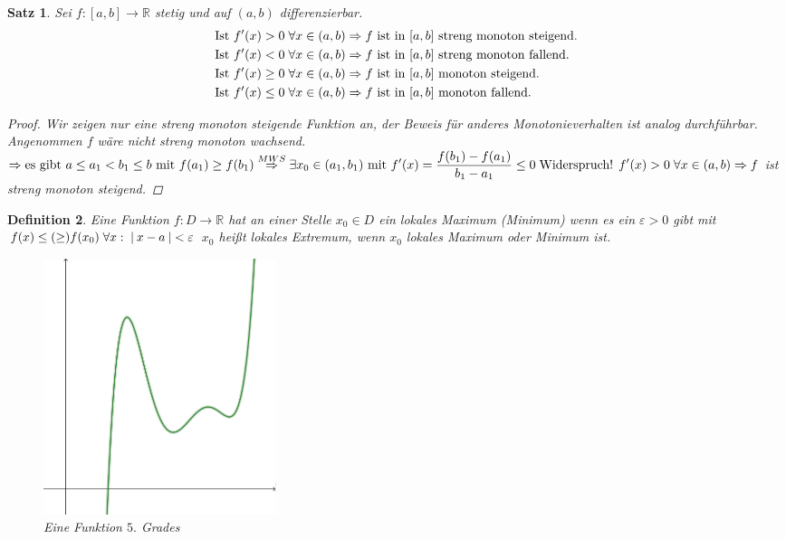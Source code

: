 \documentclass[a4paper,titlepage,oneside]{article}
\def\R{\ensuremath{\mathbb{R}} }
\renewcommand{\epsilon}{\ensuremath{\varepsilon} }
\def\WSP{\text{Widerspruch! }}
\def\sp{\hspace{0,1cm}}
\newcommand{\abs}[1]{\ensuremath{\left|\:#1\:\right|}}
\theoremstyle{thmstyle}
\newtheorem{satz}{Satz}[section]
\newtheorem{defi}[satz]{Definition}
\theoremstyle{subthmstyle}
\begin{document}
\begin{satz}
Sei $f : [a,b] \to \R $ stetig und auf $(a,b)$ differenzierbar.
\begin{align*}\text{Ist } f'(x) > 0 \sp \forall x \in (a,b) &\Rightarrow f \text{ ist in } [a,b] \text{ streng monoton steigend.}\\
\text{Ist } f'(x) < 0 \sp \forall x \in (a,b) &\Rightarrow f \text{ ist in } [a,b] \text{ streng monoton fallend.}\\
\text{Ist } f'(x) \ge 0 \sp \forall x \in (a,b) &\Rightarrow f \text{ ist in } [a,b] \text{ monoton steigend.}\\
\text{Ist } f'(x) \le 0 \sp \forall x \in (a,b) &\Rightarrow f \text{ ist in } [a,b] \text{ monoton fallend.}
\end{align*}
\begin{proof}
Wir zeigen nur eine streng monoton steigende Funktion an, der Beweis für anderes Monotonieverhalten ist analog durchführbar.\\
Angenommen $f$ wäre nicht streng monoton wachsend. $ \displaystyle \Rightarrow \text{es gibt } a \le a_1 < b_1 \le b \text{ mit } f(a_1) \ge f(b_1) \overset{MWS}{\Rightarrow} \exists x_0 \in (a_1, b_1) \text{ mit } f'(x) = \frac{f(b_1) - f(a_1)}{b_1 - a_1} \le 0 \sp \WSP f'(x) > 0 \sp \forall x \in (a,b) \Rightarrow f$ ist streng monoton steigend.
\end{proof}
\end{satz}

\begin{defi}
Eine Funktion $f : D \to \R$ hat an einer Stelle $x_0 \in D$ ein lokales Maximum (Minimum) wenn es ein $\epsilon > 0 $ gibt mit $f(x) \le (\ge) f(x_0) \sp \forall x : \sp \abs{x - a} < \epsilon$
$x_0$ heißt lokales Extremum, wenn $x_0$ lokales Maximum oder Minimum ist.
\begin{figure}[ht]\centering
 \includegraphics[width=0.33\textwidth]{images/minima_maxima.png}
\caption{Eine Funktion $5.$ Grades}
\end{figure}
\end{defi}
\end{document}
